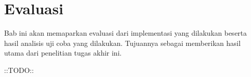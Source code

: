 \chapter{Evaluasi}
\label{chapter:Evaluasi}
Bab ini akan memaparkan evaluasi dari implementasi yang dilakukan beserta hasil analisis uji coba yang dilakukan. Tujuannya sebagai memberikan hasil utama dari penelitian tugas akhir ini.

::TODO::

% 

% 

